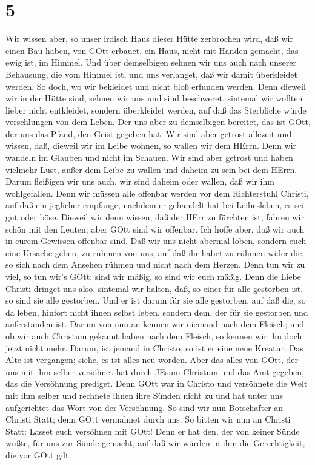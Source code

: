 \hypertarget{section-4}{%
\section{5}\label{section-4}}

 Wir wissen aber, so unser irdisch Haus dieser Hütte
zerbrochen wird, daß wir einen Bau haben, von GOtt erbauet, ein Haus,
nicht mit Händen gemacht, das ewig ist, im Himmel.  Und über
demselbigen sehnen wir uns auch nach unserer Behausung, die vom Himmel
ist, und uns verlanget, daß wir damit überkleidet werden, 
So doch, wo wir bekleidet und nicht bloß erfunden werden. 
Denn dieweil wir in der Hütte sind, sehnen wir uns und sind beschweret,
sintemal wir wollten lieber nicht entkleidet, sondern überkleidet
werden, auf daß das Sterbliche würde verschlungen von dem Leben.
 Der uns aber zu demselbigen bereitet, das ist GOtt, der uns
das Pfand, den Geist gegeben hat.  Wir sind aber getrost
allezeit und wissen, daß, dieweil wir im Leibe wohnen, so wallen wir dem
HErrn.  Denn wir wandeln im Glauben und nicht im Schauen.
 Wir sind aber getrost und haben vielmehr Lust, außer dem
Leibe zu wallen und daheim zu sein bei dem HErrn.  Darum
fleißigen wir uns auch, wir sind daheim oder wallen, daß wir ihm
wohlgefallen.  Denn wir müssen alle offenbar werden vor dem
Richterstuhl Christi, auf daß ein jeglicher empfange, nachdem er
gehandelt hat bei Leibesleben, es sei gut oder böse. 
Dieweil wir denn wissen, daß der HErr zu fürchten ist, fahren wir schön
mit den Leuten; aber GOtt sind wir offenbar. Ich hoffe aber, daß wir
auch in eurem Gewissen offenbar sind.  Daß wir uns nicht
abermal loben, sondern euch eine Ursache geben, zu rühmen von uns, auf
daß ihr habet zu rühmen wider die, so sich nach dem Ansehen rühmen und
nicht nach dem Herzen.  Denn tun wir zu viel, so tun wir's
GOtt; sind wir mäßig, so sind wir euch mäßig.  Denn die
Liebe Christi dringet uns also, sintemal wir halten, daß, so einer für
alle gestorben ist, so sind sie alle gestorben.  Und er ist
darum für sie alle gestorben, auf daß die, so da leben, hinfort nicht
ihnen selbst leben, sondern dem, der für sie gestorben und auferstanden
ist.  Darum von nun an kennen wir niemand nach dem Fleisch;
und ob wir auch Christum gekannt haben nach dem Fleisch, so kennen wir
ihn doch jetzt nicht mehr.  Darum, ist jemand in Christo,
so ist er eine neue Kreatur. Das Alte ist vergangen; siehe, es ist alles
neu worden.  Aber das alles von GOtt, der uns mit ihm
selber versöhnet hat durch JEsum Christum und das Amt gegeben, das die
Versöhnung prediget.  Denn GOtt war in Christo und
versöhnete die Welt mit ihm selber und rechnete ihnen ihre Sünden nicht
zu und hat unter uns aufgerichtet das Wort von der Versöhnung.
 So sind wir nun Botschafter an Christi Statt; denn GOtt
vermahnet durch uns. So bitten wir nun an Christi Statt: Lasset euch
versöhnen mit GOtt!  Denn er hat den, der von keiner Sünde
wußte, für uns zur Sünde gemacht, auf daß wir würden in ihm die
Gerechtigkeit, die vor GOtt gilt.

